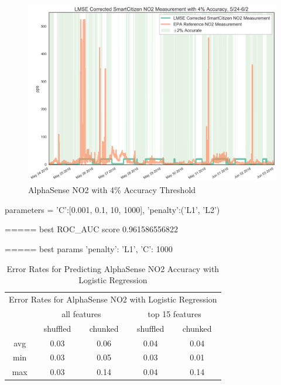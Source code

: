 \begin{figure}[htb]
 	\includegraphics[width=\textwidth]{figs/as_no2_with_4_accuracy_zoomed}               
 	 \caption{AlphaSense NO2 with 4\% Accuracy Threshold}
  	\label{fig:as_no2_with_4_accuracy_zoomed}
\end{figure}





parameters = {'C':[0.001, 0.1, 10, 1000], 'penalty':('L1', 'L2') }

===== best ROC\_AUC score 0.961586556822

===== best params {'penalty': 'L1', 'C': 1000}



\begin{table}[H]
\centering
\begin{tabular}{|c|c|c|c|c|}
\toprule
\multicolumn{5}{|c|}{Error Rates for AlphaSense NO2 with Logistic Regression} \\
&\multicolumn{2}{|c|}{all features} & \multicolumn{2}{|c|}{top 15 features} \\
&shuffled & chunked & shuffled & chunked \\
avg & 0.03 & 0.06 & 0.04 & 0.04 \\
min & 0.03 & 0.05 & 0.03 & 0.01 \\
max & 0.03 & 0.14 & 0.04 & 0.14 \\
\bottomrule
\end{tabular}
\label{tab:as1_co_error_rates}
\caption{Error Rates for Predicting AlphaSense NO2 Accuracy with Logistic Regression}
\end{table}



